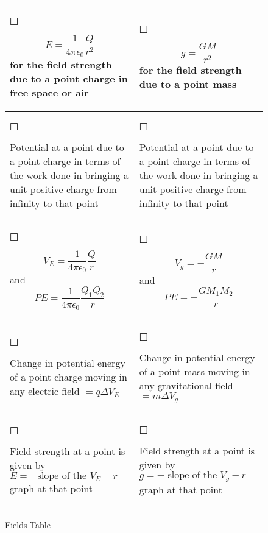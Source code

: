 \begin{itemize}
\begin{figure}
\begin{tabular}{p{} p{}}
			\begin{Large}$\Square$\end{Large} \[E=\frac{1}{4 \pi \epsilon_{0}}\frac{Q}{r^2}\]  for the field strength due to a point charge in free space or air     &\begin{Large}$\Square$\end{Large} \[g=\frac{GM}{r^2}\] for the field strength due to a point mass                                                                             \\ \midrule
			\begin{Large}$\Square$\end{Large} Potential at a point due to a point charge in terms of the work done in bringing a unit positive charge from infinity to that point & \begin{Large}$\Square$\end{Large} Potential at a point due to a point charge in terms of the work done in bringing a unit positive charge from infinity to that point \\ \midrule
			\begin{Large}$\Square$\end{Large} \[V_{E}=\frac{1}{4 \pi \epsilon_{0}}\frac{Q}{r}\] and \[PE=\frac{1}{4 \pi \epsilon_{0}}\frac{Q_{1}Q_{2}}{r}\] & \begin{Large}$\Square$\end{Large} \[V_{g}=-\frac{GM}{r}\] and \[PE=-\frac{GM_{1}M_{2}}{r}\] \\ \midrule
			\begin{Large}$\Square$\end{Large} Change in potential energy of
			a point charge moving in any electric field
			$= q \Delta V_{E}$  & \begin{Large}$\Square$\end{Large} Change in potential energy of a point mass moving in any gravitational field $= m \Delta V_{g}$\\ \midrule 
			\begin{Large}$\Square$\end{Large} Field strength at a point is
			given by
			$E = - \text{slope of the }V_{E}-r$ graph at that point & \begin{Large}$\Square$\end{Large} Field strength at a point is given by $g = - \text{ slope of the }V_{g}-r$ graph at that point \\ \bottomrule
		\end{tabular}
		\caption{Fields Table}
	\end{figure}

\end{itemize}
